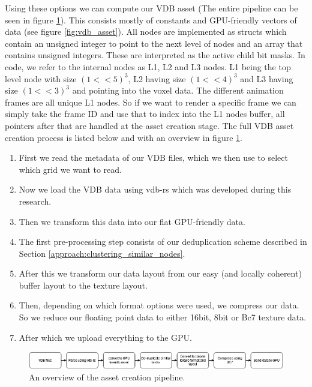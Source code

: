 Using these options we can compute our VDB asset (The entire pipeline can be seen in figure \ref{fig:vdb_asset_pipeline}). This consists mostly of constants and GPU-friendly vectors of data (see figure \ref{fig:vdb_asset}). All nodes are implemented as structs which contain an unsigned integer to point to the next level of nodes and an array that contains unsigned integers. These are interpreted as the active child bit masks. In code, we refer to the internal nodes as L1, L2 and L3 nodes. L1 being the top level node with size $(1 << 5)^3$, L2 having size $(1 << 4)^3$ and L3 having size $(1 << 3)^3$ and pointing into the voxel data. The different animation frames are all unique L1 nodes. So if we want to render a specific frame we can simply take the frame ID and use that to index into the L1 nodes buffer, all pointers after that are handled at the asset creation stage. The full VDB asset creation process is listed below and with an overview in figure \ref{fig:vdb_asset_pipeline}.
\begin{enumerate}
    \itemsep0em
    \item First we read the metadata of our VDB files, which we then use to select which grid we want to read.
    \item Now we load the VDB data using vdb-rs \cite{VDBRS} which was developed during this research.
    \item Then we transform this data into our flat GPU-friendly data.
    \item The first pre-processing step consists of our deduplication scheme described in Section \ref{approach:clustering_similar_nodes}.
    \item After this we transform our data layout from our easy (and locally coherent) buffer layout to the texture layout.
    \item Then, depending on which format options were used, we compress our data. So we reduce our floating point data to either 16bit, 8bit or Bc7 texture data.
    \item After which we upload everything to the GPU.
\end{enumerate}

\begin{figure}[H]
    \centering
    \includegraphics[width=0.9\linewidth]{figures/VDB asset pipeline.png}
    \caption{An overview of the asset creation pipeline.}
    \label{fig:vdb_asset_pipeline}
\end{figure}


